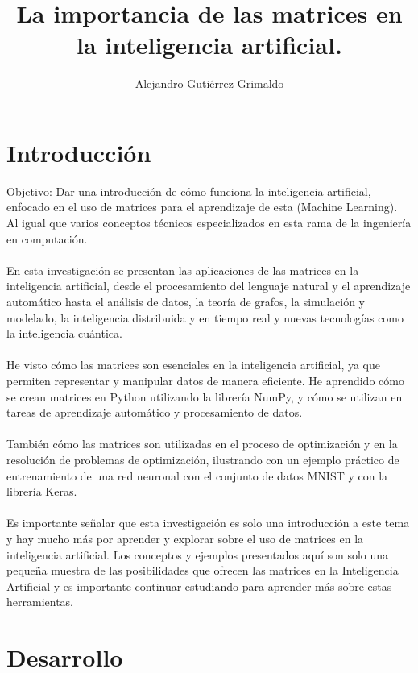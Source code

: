 \documentclass{article}
\title{La importancia de las matrices en la inteligencia artificial.}
\author{Alejandro Gutiérrez Grimaldo}
\theoremstyle{mytheoremstyle}
\theoremstyle{mytheoremstyle}
\theoremstyle{myproblemstyle}
\begin{document}
    \maketitle
\section{Introducción}

Objetivo: Dar una introducción de cómo funciona la inteligencia artificial, enfocado en el uso de matrices para el aprendizaje de esta (Machine Learning). Al igual que varios conceptos técnicos especializados en esta rama de la ingeniería en computación.
\\
\\
En esta investigación se presentan las aplicaciones de las matrices en la inteligencia artificial, desde el procesamiento del lenguaje natural y el aprendizaje automático hasta el análisis de datos, la teoría de grafos, la simulación y modelado, la inteligencia distribuida y en tiempo real y nuevas tecnologías como la inteligencia cuántica.
\\
\\
He visto cómo las matrices son esenciales en la inteligencia artificial, ya que permiten representar y manipular datos de manera eficiente. He aprendido cómo se crean matrices en Python utilizando la librería NumPy, y cómo se utilizan en tareas de aprendizaje automático y procesamiento de datos.
\\
\\
También cómo las matrices son utilizadas en el proceso de optimización y en la resolución de problemas de optimización, ilustrando con un ejemplo práctico de entrenamiento de una red neuronal con el conjunto de datos MNIST y con la librería Keras.
\\
\\
Es importante señalar que esta investigación es solo una introducción a este tema y hay mucho más por aprender y explorar sobre el uso de matrices en la inteligencia artificial. Los conceptos y ejemplos presentados aquí son solo una pequeña muestra de las posibilidades que ofrecen las matrices en la Inteligencia Artificial y es importante continuar estudiando para aprender más sobre estas herramientas.


\section{Desarrollo}
\end{document}
